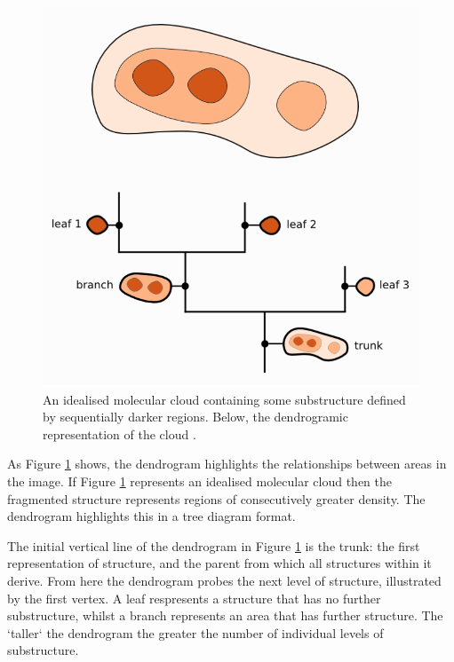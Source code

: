 \documentclass{report}
\begin{document}
\begin{figure}[h]
  \centering
  \includegraphics[scale=0.5]{../img/dendrogram}
  \caption[An idealised molecular cloud containing some substructure defined by sequentially darker regions. Below, the dendrogramic representation of the cloud \parencite{dendrogramimg}.]{An idealised molecular cloud containing some substructure defined by sequentially darker regions. Below, the dendrogramic representation of the cloud \parencite{dendrogramimg}.} \label{fig:dendrogram}
\end{figure}

As Figure \ref{fig:dendrogram} shows, the dendrogram highlights the relationships between areas in the image. If Figure \ref{fig:dendrogram} represents an idealised molecular cloud then the fragmented structure represents regions of consecutively greater density. The dendrogram highlights this in a tree diagram format.

The initial vertical line of the dendrogram in Figure \ref{fig:dendrogram} is the trunk: the first representation of structure, and the parent from which all structures within it derive. From here the dendrogram probes the next level of structure, illustrated by the first vertex. A leaf respresents a structure that has no further substructure, whilst a branch represents an area that has further structure. The `taller` the dendrogram the greater the number of individual levels of substructure.
\end{document}
